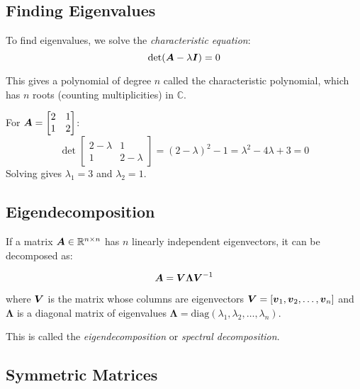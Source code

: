 \subsection{Finding Eigenvalues}

To find eigenvalues, we solve the \emph{characteristic equation}:
\begin{equation}
    \det(\boldsymbol{A} - \lambda\boldsymbol{I}) = 0
\end{equation}

This gives a polynomial of degree $n$ called the characteristic polynomial, which has $n$ roots (counting multiplicities) in $\mathbb{C}$.

\begin{example}
For $\boldsymbol{A} = \begin{bmatrix} 2 & 1 \\ 1 & 2 \end{bmatrix}$:
\begin{equation}
    \det\begin{bmatrix} 2-\lambda & 1 \\ 1 & 2-\lambda \end{bmatrix} = (2-\lambda)^2 - 1 = \lambda^2 - 4\lambda + 3 = 0
\end{equation}
Solving gives $\lambda_1 = 3$ and $\lambda_2 = 1$.
\end{example}

\subsection{Eigendecomposition}

If a matrix $\boldsymbol{A} \in \mathbb{R}^{n \times n}$ has $n$ linearly independent eigenvectors, it can be decomposed as:

\begin{equation}
    \boldsymbol{A} = \boldsymbol{V}\boldsymbol{\Lambda}\boldsymbol{V}^{-1}
\end{equation}

where $\boldsymbol{V}$ is the matrix whose columns are eigenvectors $\boldsymbol{V} = [\boldsymbol{v}_1, \boldsymbol{v}_2, \ldots, \boldsymbol{v}_n]$ and $\boldsymbol{\Lambda}$ is a diagonal matrix of eigenvalues $\boldsymbol{\Lambda} = \text{diag}(\lambda_1, \lambda_2, \ldots, \lambda_n)$.

This is called the \emph{eigendecomposition} or \emph{spectral decomposition}.

\subsection{Symmetric Matrices}

